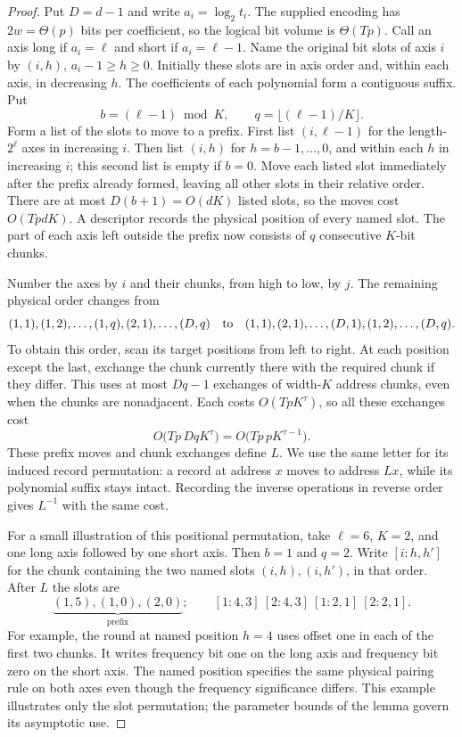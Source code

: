 \documentclass[11pt]{article}
\theoremstyle{definition}
\begin{document}
\begin{proof}
Put $D=d-1$ and write $a_i=\log_2t_i$. The supplied encoding has
$2w=\Theta(p)$ bits per coefficient, so the logical bit volume is
$\Theta(Tp)$.  Call an axis long if $a_i=\ell$ and short if
$a_i=\ell-1$.  Name the original bit slots of axis $i$ by
$(i,h)$, $a_i-1\geq h\geq0$.  Initially these slots are in axis order
and, within each axis, in decreasing $h$.  The coefficients of each
polynomial form a contiguous suffix.  Put
\[
       b=(\ell-1)\bmod K,
       \qquad q=\lfloor(\ell-1)/K\rfloor.
\]
Form a list of the slots to move to a prefix.  First list
$(i,\ell-1)$ for the length-$2^\ell$ axes in increasing $i$.
Then list $(i,h)$ for $h=b-1,\ldots,0$, and within each $h$ in
increasing $i$; this second list is empty if $b=0$.  Move each listed
slot immediately after the prefix already formed, leaving all other
slots in their relative order.  There are at most $D(b+1)=O(dK)$
listed slots, so the moves cost $O(TpdK)$.  A descriptor records the
physical position of every named slot.  The part of each axis left
outside the prefix now consists of $q$ consecutive $K$-bit chunks.

Number the axes by $i$ and their chunks, from high to low, by $j$.
The remaining physical order changes from
\[
 (1,1),(1,2),\ldots,(1,q),(2,1),\ldots,(D,q)
 \quad\hbox{to}\quad
 (1,1),(2,1),\ldots,(D,1),(1,2),\ldots,(D,q).
\]
To obtain this order, scan its target positions from left to right.
At each position except the last, exchange the chunk currently there
with the required chunk if they differ.  This uses at most $Dq-1$
exchanges of width-$K$ address chunks, even when the chunks are
nonadjacent.  Each costs $O(TpK^\tau)$, so all these exchanges cost
\[
 O\bigl(Tp\,DqK^\tau\bigr)
       =O\bigl(Tp\,pK^{\tau-1}\bigr).
\]
These prefix moves and chunk exchanges define $L$.  We use the same
letter for its induced record permutation: a record at address $x$
moves to address $Lx$, while its polynomial suffix stays intact.
Recording the inverse operations in reverse order gives $L^{-1}$
with the same cost.

For a small illustration of this positional permutation, take
$\ell=6$, $K=2$, and one long axis followed by one short axis.
Then $b=1$ and $q=2$. Write $[i:h,h']$ for the chunk containing
the two named slots $(i,h),(i,h')$, in that order. After $L$ the slots are
\[
 \underbrace{(1,5),(1,0),(2,0)}_{\text{prefix}} ;\qquad
 [1:4,3]\ [2:4,3]\ [1:2,1]\ [2:2,1].
\]
For example, the round at named position $h=4$ uses offset one in
each of the first two chunks. It writes frequency bit one on the long
axis and frequency bit zero on the short axis. The named position
specifies the same physical pairing rule on both axes even though the
frequency significance differs. This example illustrates only the slot
permutation; the parameter bounds of the lemma govern its asymptotic use.


\end{proof}
\end{document}
